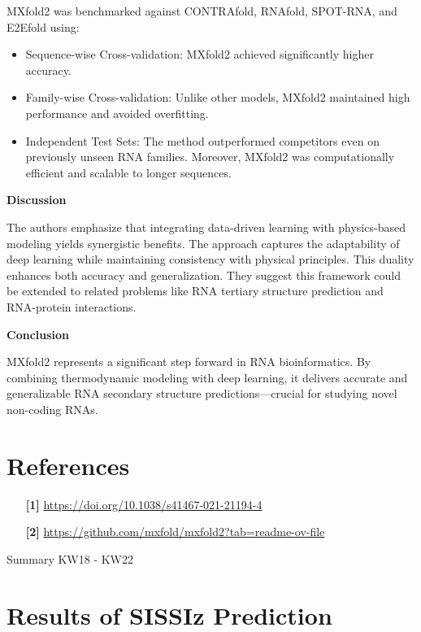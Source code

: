 \documentclass{article}
\begin{document}
\begin{large}
\begin{large}
\begin{large}
MXfold2 was benchmarked against CONTRAfold, RNAfold, SPOT-RNA, and E2Efold using:

\begin{itemize}
        \item Sequence-wise Cross-validation: MXfold2 achieved significantly higher accuracy.
        \item Family-wise Cross-validation: Unlike other models, MXfold2 maintained high performance and avoided overfitting.
        \item Independent Test Sets: The method outperformed competitors even on previously unseen RNA families. Moreover, MXfold2 was computationally efficient and scalable to longer sequences. \\[0.5em]
\end{itemize} 

\textbf{Discussion}\par
The authors emphasize that integrating data-driven learning with physics-based modeling yields synergistic benefits. The approach captures the adaptability of deep learning while maintaining consistency with physical principles. This duality enhances both accuracy and generalization. They suggest this framework could be extended to related problems like RNA tertiary structure prediction and RNA-protein interactions.\vspace{1em}

\textbf{Conclusion}\par
MXfold2 represents a significant step forward in RNA bioinformatics. By combining thermodynamic modeling with deep learning, it delivers accurate and generalizable RNA secondary structure predictions—crucial for studying novel non-coding RNAs.\vspace{1em}


\section{References}
\begin{itemize}
    \item[\textbf{[1]}] \url{https://doi.org/10.1038/s41467-021-21194-4} \par
    \item[\textbf{[2]}] \url{https://github.com/mxfold/mxfold2?tab=readme-ov-file} \par
\end{itemize}

Summary KW18 - KW22

\section{Results of SISSIz Prediction}


\end{large}
\end{large}
\end{large}
\end{document}

